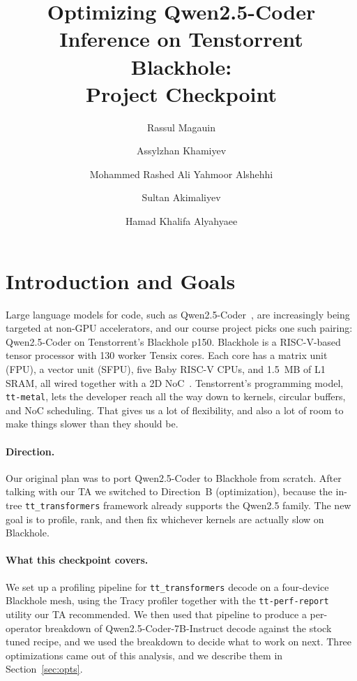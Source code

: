 \documentclass[sigplan,nonacm,review]{acmart}
\title{Optimizing Qwen2.5-Coder Inference on Tenstorrent Blackhole:\\
       Project Checkpoint}
\author{Rassul Magauin}
\author{Assylzhan Khamiyev}
\author{Mohammed Rashed Ali Yahmoor Alshehhi}
\author{Sultan Akimaliyev}
\author{Hamad Khalifa Alyahyaee}
\affiliation{%
  \institution{Mohamed bin Zayed University of Artificial Intelligence}
  \city{Abu Dhabi}\country{UAE}}
\begin{document}
\maketitle

\section{Introduction and Goals}
Large language models for code, such as Qwen2.5-Coder~\cite{qwen25coder},
are increasingly being targeted at non-GPU accelerators, and our course
project picks one such pairing: Qwen2.5-Coder on Tenstorrent's Blackhole
p150. Blackhole is a RISC-V-based tensor processor with 130 worker
Tensix cores. Each core has a matrix unit (FPU), a vector unit (SFPU),
five Baby RISC-V CPUs, and 1.5~MB of L1 SRAM, all wired together with a
2D NoC~\cite{ttmetal}. Tenstorrent's programming model, \texttt{tt-metal},
lets the developer reach all the way down to kernels, circular buffers,
and NoC scheduling. That gives us a lot of flexibility, and also a lot
of room to make things slower than they should be.

\paragraph{Direction.} Our original plan was to port Qwen2.5-Coder to
Blackhole from scratch. After talking with our TA we switched to
Direction~B (optimization), because the in-tree
\texttt{tt\_transformers} framework already supports the Qwen2.5
family. The new goal is to profile, rank, and then fix whichever
kernels are actually slow on Blackhole.

\paragraph{What this checkpoint covers.} We set up a profiling pipeline
for \texttt{tt\_transformers} decode on a four-device Blackhole mesh,
using the Tracy profiler together with the \texttt{tt-perf-report}
utility our TA recommended. We then used that pipeline to produce a
per-operator breakdown of Qwen2.5-Coder-7B-Instruct decode against the
stock tuned recipe, and we used the breakdown to decide what to work on
next. Three optimizations came out of this analysis, and we describe
them in Section~\ref{sec:opts}.

\end{document}
